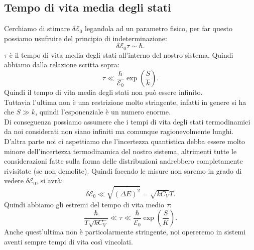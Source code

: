 \subsection{Tempo di vita media degli stati}%
Cerchiamo di stimare $\delta \mathcal{E} _{0}$ legandola ad un parametro fisico, per far questo possiamo usufruire del principio di indeterminazione:
\[
	\delta \mathcal{E} _{0} \tau  \sim \hbar
.\] 
$\tau $ è il tempo di vita media degli stati all'interno del nostro sistema.
Quindi abbiamo dalla relazione scritta sopra:
\[
	\tau \ll \frac{\hbar}{\mathcal{E}_{0} }\exp\left( \frac{S}{k} \right) 
.\] 
Quindi il tempo di vita media degli stati non può essere infinito.\\
Tuttavia l'ultima non è una restrizione molto stringente, infatti in genere si ha che $S \gg k$, quindi l'esponenziale è un numero enorme. \\
Di conseguenza possiamo assumere che i tempi di vita degli stati termodinamici da noi considerati non siano infiniti ma comunque ragionevolmente lunghi. \\
D'altra parte noi ci aspettiamo che l'incertezza quantistica debba essere molto minore dell'incertezza termodinamica del nostro sistema, altrimenti tutte le considerazioni fatte sulla forma delle distribuzioni andrebbero completamente rivisitate (se non demolite). Quindi facendo le misure non saremo in grado di vedere $\delta \mathcal{E} _{0}$, si avrà:
\[
	\delta \mathcal{E} _{0}\ll \sqrt{\overline{\left( \Delta E \right) ^2}} = \sqrt{k C_{V}} T
.\] 
Quindi abbiamo gli estremi del tempo di vita medio $\tau $:
\[
	\frac{\hbar}{T\sqrt{k C_{V}} } \ll \tau \ll \frac{\hbar}{\mathcal{E}_{0} } \exp\left( \frac{S}{K} \right) 
.\] 
Anche quest'ultima non è particolarmente stringente, noi opereremo in sistemi aventi sempre tempi di vita così vincolati.\\

